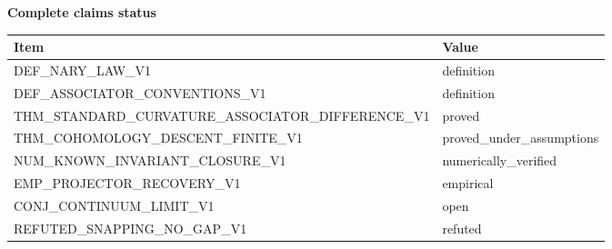 \begin{center}
\textbf{Complete claims status}\par\smallskip
\begin{tabular}{ll}
\toprule
Item & Value \\
\midrule
DEF\_NARY\_LAW\_V1 & definition \\
DEF\_ASSOCIATOR\_CONVENTIONS\_V1 & definition \\
THM\_STANDARD\_CURVATURE\_ASSOCIATOR\_DIFFERENCE\_V1 & proved \\
THM\_COHOMOLOGY\_DESCENT\_FINITE\_V1 & proved\_under\_assumptions \\
NUM\_KNOWN\_INVARIANT\_CLOSURE\_V1 & numerically\_verified \\
EMP\_PROJECTOR\_RECOVERY\_V1 & empirical \\
CONJ\_CONTINUUM\_LIMIT\_V1 & open \\
REFUTED\_SNAPPING\_NO\_GAP\_V1 & refuted \\
\bottomrule
\end{tabular}
\end{center}

